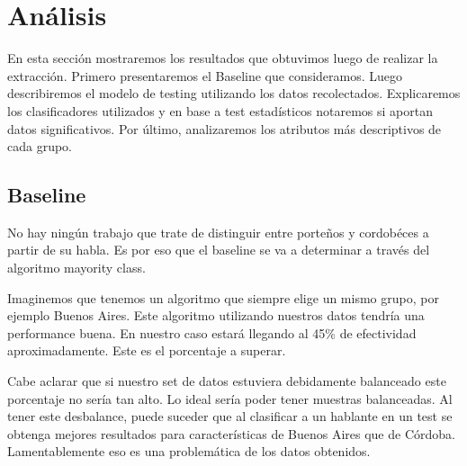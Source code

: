 \chapter{Análisis}

En esta sección mostraremos los resultados que obtuvimos luego de realizar la extracción. Primero presentaremos el Baseline que consideramos. Luego describiremos el modelo de testing utilizando los datos recolectados. Explicaremos los clasificadores utilizados y en base a test estadísticos notaremos si aportan datos significativos. Por último, analizaremos los atributos más descriptivos de cada grupo.

\section{Baseline}

No hay ningún trabajo que trate de distinguir entre porteños y cordobéces a partir de su habla. Es por eso que el baseline se va a determinar a través del algoritmo mayority class.

Imaginemos que tenemos un algoritmo que siempre elige un mismo grupo, por ejemplo Buenos Aires. Este algoritmo utilizando nuestros datos tendría una performance buena. En nuestro caso estará llegando al 45\% de efectividad aproximadamente. Este es el porcentaje a superar. 



Cabe aclarar que si nuestro set de datos estuviera debidamente balanceado este porcentaje no sería tan alto. Lo ideal sería poder tener muestras balanceadas. Al tener este desbalance, puede suceder que al clasificar a un hablante en un test se obtenga mejores resultados para características de Buenos Aires que de Córdoba. Lamentablemente eso es una problemática de los datos obtenidos.

